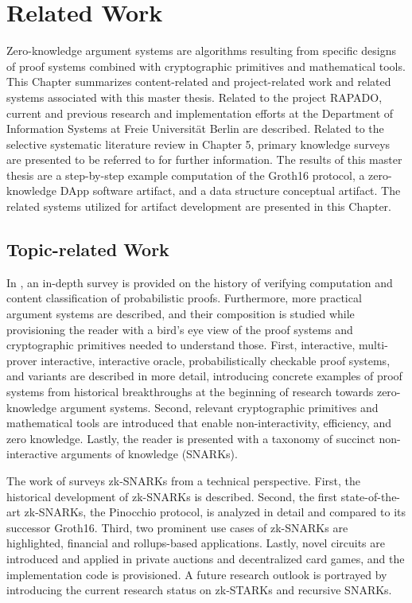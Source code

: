 \chapter{Related Work}
Zero-knowledge argument systems are algorithms resulting from specific designs of proof systems combined with cryptographic primitives and mathematical tools. This Chapter summarizes content-related and project-related work and related systems associated with this master thesis. Related to the project RAPADO, current and previous research and implementation efforts at the Department of Information Systems at Freie Universit{\"a}t Berlin are described. Related to the selective systematic literature review in Chapter 5, primary knowledge surveys are presented to be referred to for further information. The results of this master thesis are a step-by-step example computation of the Groth16 protocol, a zero-knowledge DApp software artifact, and a data structure conceptual artifact. The related systems utilized for artifact development are presented in this Chapter.

\section{Topic-related Work}
In \citet{Thaler}, an in-depth survey is provided on the history of verifying computation and content classification of probabilistic proofs. Furthermore, more practical argument systems are described, and their composition is studied while provisioning the reader with a bird's eye view of the proof systems and cryptographic primitives needed to understand those. First, interactive, multi-prover interactive, interactive oracle, probabilistically checkable proof systems, and variants are described in more detail, introducing concrete examples of proof systems from historical breakthroughs at the beginning of research towards zero-knowledge argument systems. Second, relevant cryptographic primitives and mathematical tools are introduced that enable non-interactivity, efficiency, and zero knowledge. Lastly, the reader is presented with a taxonomy of succinct non-interactive arguments of knowledge (SNARKs).

The work of \citet{chen2022review} surveys zk-SNARKs from a technical perspective. First, the historical development of zk-SNARKs is described. Second, the first state-of-the-art zk-SNARKs, the Pinocchio protocol, is analyzed in detail and compared to its successor Groth16. Third, two prominent use cases of zk-SNARKs are highlighted, financial and rollups-based applications. Lastly, novel circuits are introduced and applied in private auctions and decentralized card games, and the implementation code is provisioned. A future research outlook is portrayed by introducing the current research status on zk-STARKs and recursive SNARKs.

